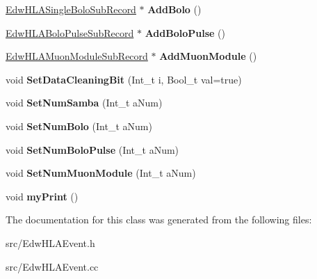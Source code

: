 \begin{DoxyCompactItemize}
\item 
\hypertarget{class_edw_h_l_a_event_a78249f4509ecd82fe3d2956fb0511e0c}{
\hyperlink{class_edw_h_l_a_single_bolo_sub_record}{EdwHLASingleBoloSubRecord} $\ast$ {\bfseries AddBolo} ()}
\label{class_edw_h_l_a_event_a78249f4509ecd82fe3d2956fb0511e0c}

\item 
\hypertarget{class_edw_h_l_a_event_adf1cfad4f41ad9d1733dfd7d1651daf8}{
\hyperlink{class_edw_h_l_a_bolo_pulse_sub_record}{EdwHLABoloPulseSubRecord} $\ast$ {\bfseries AddBoloPulse} ()}
\label{class_edw_h_l_a_event_adf1cfad4f41ad9d1733dfd7d1651daf8}

\item 
\hypertarget{class_edw_h_l_a_event_a1106aff1523b4cd4b607cbd15e4dab3f}{
\hyperlink{class_edw_h_l_a_muon_module_sub_record}{EdwHLAMuonModuleSubRecord} $\ast$ {\bfseries AddMuonModule} ()}
\label{class_edw_h_l_a_event_a1106aff1523b4cd4b607cbd15e4dab3f}

\item 
\hypertarget{class_edw_h_l_a_event_a7a291bd5ea8f7d40da8ce20ed0eb2659}{
void {\bfseries SetDataCleaningBit} (Int\_\-t i, Bool\_\-t val=true)}
\label{class_edw_h_l_a_event_a7a291bd5ea8f7d40da8ce20ed0eb2659}

\item 
\hypertarget{class_edw_h_l_a_event_ad6aa3e5a0d5998656cd0418ae1e7af34}{
void {\bfseries SetNumSamba} (Int\_\-t aNum)}
\label{class_edw_h_l_a_event_ad6aa3e5a0d5998656cd0418ae1e7af34}

\item 
\hypertarget{class_edw_h_l_a_event_ab9fb25a4ba097ce99d1324e23b1b7357}{
void {\bfseries SetNumBolo} (Int\_\-t aNum)}
\label{class_edw_h_l_a_event_ab9fb25a4ba097ce99d1324e23b1b7357}

\item 
\hypertarget{class_edw_h_l_a_event_a3d7c2eb5e5bf09847c0dfa520f495ba2}{
void {\bfseries SetNumBoloPulse} (Int\_\-t aNum)}
\label{class_edw_h_l_a_event_a3d7c2eb5e5bf09847c0dfa520f495ba2}

\item 
\hypertarget{class_edw_h_l_a_event_ad6468592fd81dd5e84571362a081b3bc}{
void {\bfseries SetNumMuonModule} (Int\_\-t aNum)}
\label{class_edw_h_l_a_event_ad6468592fd81dd5e84571362a081b3bc}

\item 
\hypertarget{class_edw_h_l_a_event_a4a4571bf481c3934293d6414bec98344}{
void {\bfseries myPrint} ()}
\label{class_edw_h_l_a_event_a4a4571bf481c3934293d6414bec98344}

\end{DoxyCompactItemize}


The documentation for this class was generated from the following files:\begin{DoxyCompactItemize}
\item 
src/EdwHLAEvent.h\item 
src/EdwHLAEvent.cc\end{DoxyCompactItemize}
